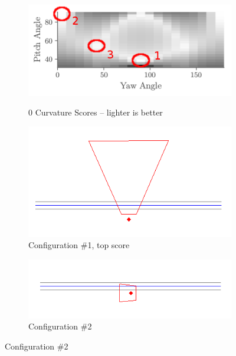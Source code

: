 \documentclass[a4paper,12pt,twoside,openright]{report}
\begin{document}
\begin{figure}[h!]
    \begin{subfigure}[b]{0.45\textwidth}
    \centering
    \includegraphics[width=\textwidth]{figures/simple_objective/pitch_yaw_0_curvature_annotated.png}
    \label{fig:simpleobjective:0curvature}
    \caption{0 Curvature Scores -- lighter is better}
\end{subfigure}
\begin{subfigure}[b]{0.45\textwidth}
    \centering
    \includegraphics[width=\textwidth]{figures/simple_objective/0_curvature_bestpos_small.png}
    \caption{Configuration \#1, top score}
\end{subfigure}
\begin{subfigure}[b]{0.49\textwidth}
    \centering
    \includegraphics[width=\textwidth]{figures/simple_objective/0_curvature_pos2_small.png}
    \caption{Configuration \#2}

\end{subfigure}
\end{figure}
\end{document}
